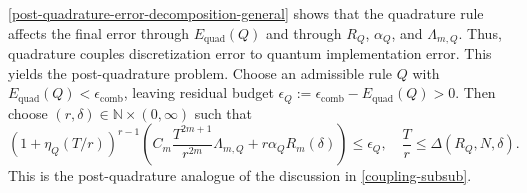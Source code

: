\documentclass[10pt,reqno]{article}
\numberwithin{equation}{section}
\theoremstyle{plain}
\theoremstyle{definition}
\begin{document}
\cref{post-quadrature-error-decomposition-general} shows that the quadrature rule affects the final error through \(E_{\mathrm{quad}}(Q)\) and through \(R_Q\), \(\alpha_Q\), and \(\Lambda_{m,Q}\). Thus, quadrature couples discretization error to quantum implementation error. This yields the post-quadrature problem. Choose an admissible rule \(Q\) with \(E_{\mathrm{quad}}(Q)<\epsilon_{\mathrm{comb}}\), leaving residual budget $\epsilon_Q := \epsilon_{\mathrm{comb}}-E_{\mathrm{quad}}(Q) > 0$. Then choose \((r,\delta)\in\mathbb N\times(0,\infty)\) such that
\begin{equation}
(1+\eta_Q(T/r))^{r-1} \left( C_m\frac{T^{2m+1}}{r^{2m}}\Lambda_{m,Q} + r\alpha_QR_m(\delta ) \right) \le \epsilon_Q, \quad \frac{T}{r}\le \Delta(R_Q,N,\delta ).
\end{equation}
This is the post-quadrature analogue of the discussion in \cref{coupling-subsub}. 
 
\end{document}
